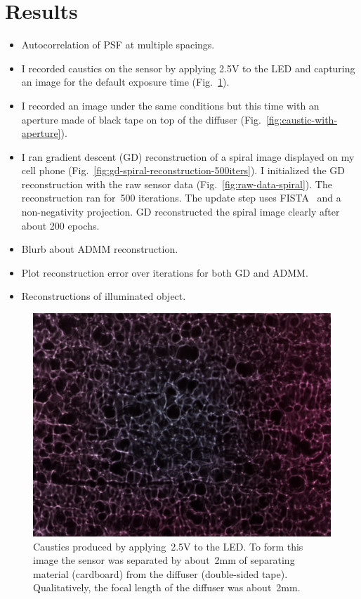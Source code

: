 \documentclass[final]{cvpr}
\begin{document}
\section{Results}

\begin{itemize}
	\item Autocorrelation of PSF at multiple spacings.

	\item I recorded caustics on the sensor by applying 2.5V to the LED and capturing an image for the default exposure time (Fig.~\ref{fig:caustic}).

	\item I recorded an image under the same conditions but this time with
	      an aperture made of black tape on top of the diffuser
	      (Fig.~\ref{fig:caustic-with-aperture}).

	\item I ran gradient descent (GD) reconstruction of a spiral image displayed
	      on my cell phone
	      (Fig.~\ref{fig:gd-spiral-reconstruction-500iters}).
	      I initialized the GD reconstruction with the raw sensor data
	      (Fig.~\ref{fig:raw-data-spiral}).
	      The reconstruction ran for~\num{500} iterations.
	      The update step uses FISTA~\cite{beck2009fast} and a
	      non-negativity projection.
	      GD reconstructed the spiral image clearly after about 200 epochs.

	\item Blurb about ADMM reconstruction.

	\item Plot reconstruction error over iterations for both GD and ADMM\@.

	\item Reconstructions of illuminated object.
\end{itemize}


\begin{figure}[t]
	\centering
	\includegraphics[width=1.0\linewidth]{images/caustic}
	\caption{\label{fig:caustic}
		Caustics produced by applying~\num{2.5}V to the LED\@.
		To form this image the sensor was separated by about~\num{2}mm
		of separating material (cardboard) from the diffuser (double-sided tape).
		Qualitatively, the focal length of the diffuser was about~\num{2}mm.}
\end{figure}
\end{document}
